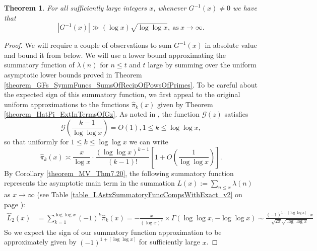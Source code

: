 \documentclass[11pt,reqno,a4letter]{article}
\numberwithin{figure}{section}
\numberwithin{table}{section}
\newcommand{\ceiling}[1]{\left\lceil #1 \right\rceil}
\theoremstyle{plain}
\newtheorem{theorem}{Theorem}
\numberwithin{theorem}{section}
\theoremstyle{definition}
\begin{document}
\begin{theorem} 
\label{theorem_GInvxLowerBoundByGEInvx_v1} 
For all sufficiently large integers $x$, whenever $G^{-1}(x) \neq 0$ we have that 
\[
|G^{-1}(x)| \gg (\log x) \sqrt{\log\log x}, \mathrm{\ as\ } x \rightarrow \infty. 
\]
\end{theorem} 
\begin{proof} 
We will require a couple of observations to sum $G^{-1}(x)$ 
in absolute value and bound it from below. 
We will use a lower bound approximating the summatory function of $\lambda(n)$ for $n \leq t$ and 
$t$ large by summing over the uniform asymptotic lower bounds proved in 
Theorem \ref{theorem_GFs_SymmFuncs_SumsOfRecipOfPowsOfPrimes}. 
To be careful about the expected sign of this summatory function, 
we first appeal to the original uniform approximations to the 
functions $\widehat{\pi}_k(x)$ 
given by Theorem \ref{theorem_HatPi_ExtInTermsOfGz}. 
As noted in \cite[\S 7.4]{MV}, the function $\mathcal{G}(z)$ satisfies 
\[
\mathcal{G}\left(\frac{k-1}{\log\log x}\right) = O(1), 1 \leq k \leq \log\log x, 
\]
so that uniformly for $1 \leq k \leq \log\log x$ we can write 
\[
\widehat{\pi}_k(x) \asymp \frac{x}{\log x} \cdot \frac{(\log\log x)^{k-1}}{(k-1)!} \left[ 
     1 + O\left(\frac{1}{\log\log x}\right)\right]. 
\]
By Corollary \ref{theorem_MV_Thm7.20}, the 
following summatory function represents the asymptotic main term 
in the summation $L(x) := \sum_{n \leq x} \lambda(n)$ as $x \rightarrow \infty$ 
(see Table \ref{table_LAstxSummatoryFuncCompsWithExact_v2} on page 
\pageref{table_LAstxSummatoryFuncCompsWithExact_v2}): 
\begin{align*} 
\widehat{L}_2(x) & = \sum_{k=1}^{\log\log x} (-1)^{k} \widehat{\pi}_k(x) 
     = - \frac{x}{(\log x)^2} \times \Gamma(\log\log x, -\log\log x) 
     \sim \frac{(-1)^{1+\ceiling{\log\log x}} \cdot x}{\sqrt{2\pi} \sqrt{\log\log x}}
\end{align*} 
So we expect the sign of our summatory function approximation to be approximately 
given by $(-1)^{1+\ceiling{\log\log x}}$ for sufficiently large $x$. 


\end{proof}
\end{document}
